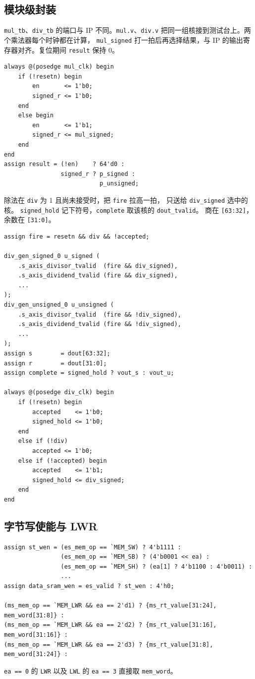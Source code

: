 \documentclass{article}
\begin{document}
\subsection{模块级封装}
\label{sec:mdwrap}
\texttt{mul\_tb}、\texttt{div\_tb} 的端口与 IP 不同。\texttt{mul.v}、\texttt{div.v}
把同一组核接到测试台上。两个乘法器每个时钟都在计算，
\texttt{mul\_signed} 打一拍后再选择结果，与 IP 的输出寄存器对齐。复位期间 \texttt{result} 保持 0。
\begin{verbatim}
always @(posedge mul_clk) begin
    if (!resetn) begin
        en       <= 1'b0;
        signed_r <= 1'b0;
    end
    else begin
        en       <= 1'b1;
        signed_r <= mul_signed;
    end
end
assign result = (!en)    ? 64'd0 :
                signed_r ? p_signed :
                           p_unsigned;
\end{verbatim}
除法在 \texttt{div} 为 1 且尚未接受时，把 \texttt{fire} 拉高一拍，
只送给 \texttt{div\_signed} 选中的核。
\texttt{signed\_hold} 记下符号，\texttt{complete} 取该核的 \texttt{dout\_tvalid}。
商在 \texttt{[63:32]}，余数在 \texttt{[31:0]}。
\begin{verbatim}
assign fire = resetn && div && !accepted;

div_gen_signed_0 u_signed (
    .s_axis_divisor_tvalid  (fire && div_signed),
    .s_axis_dividend_tvalid (fire && div_signed),
    ...
);
div_gen_unsigned_0 u_unsigned (
    .s_axis_divisor_tvalid  (fire && !div_signed),
    .s_axis_dividend_tvalid (fire && !div_signed),
    ...
);
assign s        = dout[63:32];
assign r        = dout[31:0];
assign complete = signed_hold ? vout_s : vout_u;

always @(posedge div_clk) begin
    if (!resetn) begin
        accepted    <= 1'b0;
        signed_hold <= 1'b0;
    end
    else if (!div)
        accepted <= 1'b0;
    else if (!accepted) begin
        accepted    <= 1'b1;
        signed_hold <= div_signed;
    end
end
\end{verbatim}

\subsection{字节写使能与 LWR}
\begin{verbatim}
assign st_wen = (es_mem_op == `MEM_SW) ? 4'b1111 :
                (es_mem_op == `MEM_SB) ? (4'b0001 << ea) :
                (es_mem_op == `MEM_SH) ? (ea[1] ? 4'b1100 : 4'b0011) :
                ...
assign data_sram_wen = es_valid ? st_wen : 4'h0;

(ms_mem_op == `MEM_LWR && ea == 2'd1) ? {ms_rt_value[31:24], mem_word[31:8]} :
(ms_mem_op == `MEM_LWR && ea == 2'd2) ? {ms_rt_value[31:16], mem_word[31:16]} :
(ms_mem_op == `MEM_LWR && ea == 2'd3) ? {ms_rt_value[31:8],  mem_word[31:24]} :
\end{verbatim}
\texttt{ea == 0} 的 \texttt{LWR} 以及 \texttt{LWL} 的 \texttt{ea == 3} 直接取 \texttt{mem\_word}。
\end{document}
